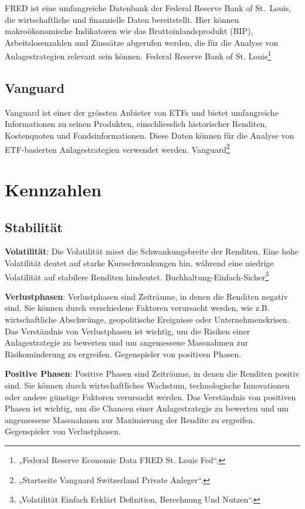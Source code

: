 \documentclass[
  ngerman,
  a4paper,
  DIV=11,
  oneside]{scrreprt}
\begin{document}
FRED ist eine umfangreiche Datenbank der Federal Reserve Bank of
St.~Louis, die wirtschaftliche und finanzielle Daten bereitstellt. Hier
können makroökonomische Indikatoren wie das Bruttoinlandsprodukt (BIP),
Arbeitslosenzahlen und Zinssätze abgerufen werden, die für die Analyse
von Anlagestrategien relevant sein können. Federal Reserve Bank of St.
Louis\footnote{{„Federal {Reserve Economic Data} \textbar{} {FRED}
  \textbar{} {St}. {Louis Fed}``}.}

\subsection{Vanguard}\label{vanguard-1}

Vanguard ist einer der grössten Anbieter von ETFs und bietet
umfangreiche Informationen zu seinen Produkten, einschliesslich
historischer Renditen, Kostenquoten und Fondsinformationen. Diese Daten
können für die Analyse von ETF-basierten Anlagestrategien verwendet
werden. Vanguard\footnote{{„Startseite \textbar{} Vanguard Switzerland
  Private Anleger``}.}

\section{Kennzahlen}\label{kennzahlen}

\subsection{Stabilität}\label{stabilituxe4t}

\textbf{Volatilität}: Die Volatilität misst die Schwankungsbreite der
Renditen. Eine hohe Volatilität deutet auf starke Kursschwankungen hin,
während eine niedrige Volatilität auf stabilere Renditen hindeutet.
Buchhaltung-Einfach-Sicher\footnote{{„Volatilität Einfach Erklärt
  \textbar{} {Definition}, {Berechnung} Und {Nutzen}``}.}

\textbf{Verlustphasen}: Verlustphasen sind Zeiträume, in denen die
Renditen negativ sind. Sie können durch verschiedene Faktoren verursacht
werden, wie z.B. wirtschaftliche Abschwünge, geopolitische Ereignisse
oder Unternehmenskrisen. Das Verständnis von Verlustphasen ist wichtig,
um die Risiken einer Anlagestrategie zu bewerten und um angemessene
Massnahmen zur Risikominderung zu ergreifen. Gegenspieler von positiven
Phasen.

\textbf{Positive Phasen}: Positive Phasen sind Zeiträume, in denen die
Renditen positiv sind. Sie können durch wirtschaftliches Wachstum,
technologische Innovationen oder andere günstige Faktoren verursacht
werden. Das Verständnis von positiven Phasen ist wichtig, um die Chancen
einer Anlagestrategie zu bewerten und um angemessene Massnahmen zur
Maximierung der Rendite zu ergreifen. Gegenspieler von Verlustphasen.
\end{document}
